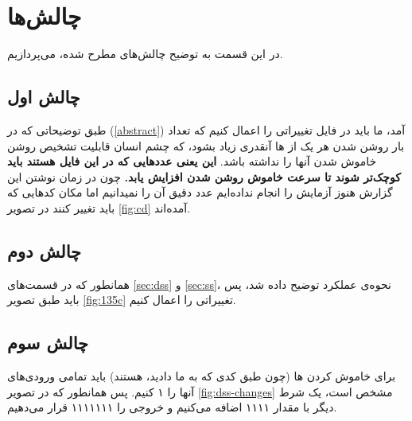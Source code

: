 \documentclass[dvipsnames, svgnames, x11names, a4paper, 11pt]{article}
\begin{document}
\section{چالش‌ها}
در این قسمت به توضیح چالش‌های مطرح شده، می‌پردازیم.

\subsection{چالش اول}
طبق توضیحاتی که در 
(\ref{abstract})
آمد، ما باید در فایل 
تغییراتی را اعمال کنیم که تعداد بار روشن شدن هر یک از 
ها
آنقدری زیاد بشود، که چشم انسان قابلیت تشخیص روشن خاموش شدن آنها را نداشته باشد.
\textbf{این یعنی عدد‌هایی که در این فایل‌ هستند باید کوچک‌تر شوند تا سرعت خاموش روشن شدن افزایش یابد.}
چون در زمان نوشتن این گزارش هنوز آزمایش را انجام نداده‌ایم عدد دقیق آن را نمیدانیم اما مکان‌ کد‌هایی که باید تغییر کنند در تصویر
\ref{fig:cd}
آمده‌اند.
\subsection{چالش دوم}\label{subsec:sec-chal}
همانطور که در قسمت‌های
\ref{sec:dss}
و
\ref{sec:ss}،
نحوه‌ی عملکرد توضیح داده شد، پس باید طبق تصویر 
\ref{fig:135c}
تغییراتی را اعمال کنیم. 
\subsection{چالش سوم}
برای خاموش کردن 
ها
(چون طبق کدی که به ما دادید،  هستند) باید تمامی ورودی‌های آنها را ۱ کنیم. پس همانطور که در تصویر 
\ref{fig:dss-changes}
مشخص است، یک شرط دیگر با مقدار ۱۱۱۱ اضافه می‌کنیم و خروجی را ۱۱۱۱۱۱۱ قرار می‌دهیم.
\end{document}
